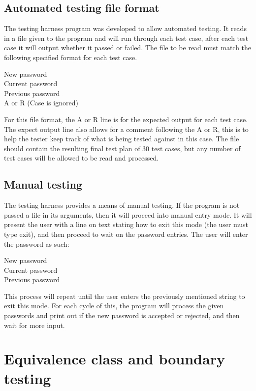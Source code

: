 \documentclass[12pt,letterpaper]{article}
\begin{document}
\subsection{Automated testing file format}

The testing harness program was developed to allow automated testing. It reads in a file given to the
program and will run through each test case, after each test case it will output whether it
passed or failed. The file to be read must match the following specified format for each test case.

\begin{center}
New password \\
Current password \\
Previous password \\
A or R (Case is ignored)
\end{center}

For this file format, the A or R line is for the expected output for each test case. The expect output
line also allows for a comment following the A or R, this is to help the tester keep track of
what is being tested against in this case. The file should contain the resulting final
test plan of 30 test cases, but any number of test cases will be allowed to be
read and processed.

\subsection{Manual testing}

The testing harness provides a means of manual testing. If the program is not passed a file
in its arguments, then it will proceed into manual entry mode. It will present the user
with a line on text stating how to exit this mode (the user must type exit), and then proceed
to wait on the password entries. The user will enter the password as such:
\begin{center}
New password \\
Current password \\
Previous password \\
\end{center}

This process will repeat until the user enters the previously mentioned string to exit this mode.
For each cycle of this, the program will process the given passwords and print out if the
new password is accepted or rejected, and then wait for more input.

\section{Equivalence class and boundary testing}
\end{document}
